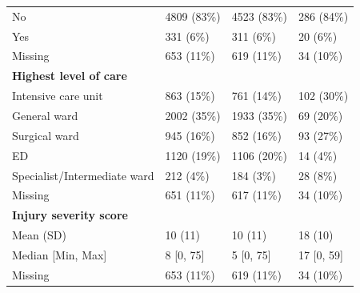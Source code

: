 \documentclass[12pt, letterpaper]{article}
\begin{document}
\begin{table}
{\begin{tabular}{llll}
            \hspace{3mm}No                                & 4809 (83\%)      & 4523 (83\%)     & 286 (84\%)    \\
            \hspace{3mm}Yes                               & 331 (6\%)        & 311 (6\%)       & 20 (6\%)      \\
            \hspace{3mm}Missing                           & 653 (11\%)       & 619 (11\%)      & 34 (10\%)     \\
            \textbf{Highest level of care}                &                  &                 &               \\
            \hspace{3mm}Intensive care unit               & 863 (15\%)       & 761 (14\%)      & 102 (30\%)    \\
            \hspace{3mm}General ward                      & 2002 (35\%)      & 1933 (35\%)     & 69 (20\%)     \\
            \hspace{3mm}Surgical ward                     & 945 (16\%)       & 852 (16\%)      & 93 (27\%)     \\
            \hspace{3mm}ED                                & 1120 (19\%)      & 1106 (20\%)     & 14 (4\%)      \\
            \hspace{3mm}Specialist/Intermediate ward      & 212 (4\%)        & 184 (3\%)       & 28 (8\%)      \\
            \hspace{3mm}Missing                           & 651 (11\%)       & 617 (11\%)      & 34 (10\%)     \\
            \textbf{Injury severity score}                &                  &                 &               \\
            \hspace{3mm}Mean (SD)                         & 10 (11)          & 10 (11)         & 18 (10)       \\
            \hspace{3mm}Median [Min, Max]                 & 8 [0, 75]        & 5 [0, 75]       & 17 [0, 59]    \\
            \hspace{3mm}Missing                           & 653 (11\%)       & 619 (11\%)      & 34 (10\%)     \\

\end{tabular}}
\end{table}
\end{document}
